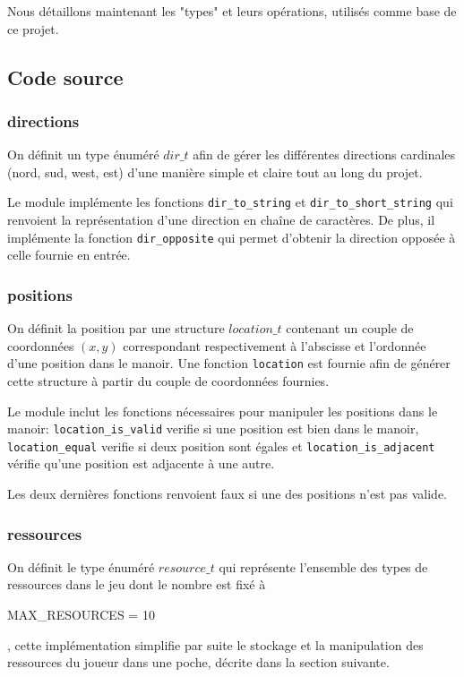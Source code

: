 
Nous détaillons maintenant les "types" et leurs opérations, utilisés comme base de ce projet.

\subsection{Code source}
\subsubsection{directions}\label{sssec:directions}

On définit un type énuméré $dir\_t$ afin de gérer les différentes directions cardinales (nord, sud, west, est) d'une manière simple et claire tout au long du projet.

Le module implémente les fonctions \texttt{dir\_to\_string} et \texttt{dir\_to\_short\_string} qui renvoient la représentation d'une direction en chaîne de caractères. De plus, il implémente la fonction \texttt{dir\_opposite} qui permet d'obtenir la direction opposée à celle fournie en entrée.

\subsubsection{positions}\label{sssec:locations}

On définit la position par une structure $location\_t$ contenant un couple de coordonnées $(x,y)$ correspondant respectivement à l'abscisse et l'ordonnée d'une position dans le manoir. Une fonction \texttt{location} est fournie afin de générer cette structure à partir du couple de coordonnées fournies.

Le module inclut les fonctions nécessaires pour manipuler les positions dans le manoir: \texttt{location\_is\_valid} verifie si une position est bien dans le manoir, \texttt{location\_equal} verifie si deux position sont égales et \texttt{location\_is\_adjacent} vérifie qu'une position est adjacente à une autre.

Les deux dernières fonctions renvoient faux si une des positions n'est pas valide.

\subsubsection{ressources}\label{sssec:resources}

On définit le type énuméré $resource\_t$ qui représente l'ensemble des types de ressources dans le jeu dont le nombre est fixé à \begin{scriptsize}MAX\_RESOURCES = 10\end{scriptsize}, cette implémentation simplifie par suite le stockage et la manipulation des ressources du joueur dans une poche, décrite dans la section suivante.

